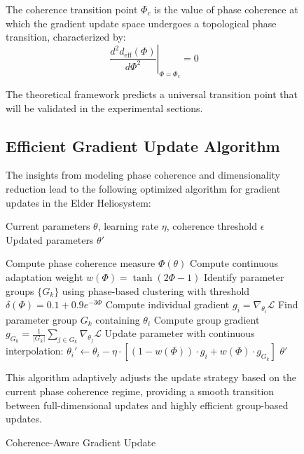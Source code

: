 \begin{figure}[ht]
\begin{definition}
The coherence transition point $\Phi_c$ is the value of phase coherence at which the gradient update space undergoes a topological phase transition, characterized by:
\begin{equation}
\left. \frac{d^2 d_{\text{eff}}(\Phi)}{d\Phi^2} \right|_{\Phi=\Phi_c} = 0
\end{equation}
\end{definition}

The theoretical framework predicts a universal transition point that will be validated in the experimental sections.



\subsection{Efficient Gradient Update Algorithm}

The insights from modeling phase coherence and dimensionality reduction lead to the following optimized algorithm for gradient updates in the Elder Heliosystem:

\begin{algorithm}
\caption{Coherence-Aware Gradient Update}
\begin{algorithmic}[1]
\Require Current parameters $\theta$, learning rate $\eta$, coherence threshold $\epsilon$
\Ensure Updated parameters $\theta'$

\State Compute phase coherence measure $\Phi(\theta)$
\State Compute continuous adaptation weight $w(\Phi) = \tanh(2\Phi - 1)$
\State Identify parameter groups $\{G_k\}$ using phase-based clustering with threshold $\delta(\Phi) = 0.1 + 0.9e^{-3\Phi}$
    \State Compute individual gradient $g_i = \nabla_{\theta_i} \mathcal{L}$
    \State Find parameter group $G_k$ containing $\theta_i$
    \State Compute group gradient $g_{G_k} = \frac{1}{|G_k|} \sum_{j \in G_k} \nabla_{\theta_j} \mathcal{L}$
    \State Update parameter with continuous interpolation:
    \State $\theta_i' \leftarrow \theta_i - \eta \cdot \left[ (1-w(\Phi)) \cdot g_i + w(\Phi) \cdot g_{G_k} \right]$
\EndFor
\State \Return $\theta'$
\end{algorithmic}
\end{algorithm}

This algorithm adaptively adjusts the update strategy based on the current phase coherence regime, providing a smooth transition between full-dimensional updates and highly efficient group-based updates.


\end{figure}
